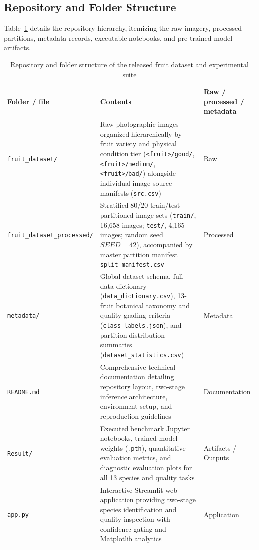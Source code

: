\documentclass[11pt,a4paper]{article}
\begin{document}
\subsection{Repository and Folder Structure}
Table~\ref{tab:folder-structure} details the repository hierarchy, itemizing the raw imagery, processed partitions, metadata records, executable notebooks, and pre-trained model artifacts.

\begin{table}[H]
\centering\small
\begin{tabularx}{\textwidth}{|p{}|X|p{}|}
\hline
\textbf{Folder / file} & \textbf{Contents} & \textbf{Raw / processed / metadata} \\
\hline
\texttt{fruit\_dataset/} & Raw photographic images organized hierarchically by fruit variety and physical condition tier (\texttt{<fruit>/good/}, \texttt{<fruit>/medium/}, \texttt{<fruit>/bad/}) alongside individual image source manifests (\texttt{src.csv}) & Raw \\
\hline
\texttt{fruit\_dataset\_processed/} & Stratified 80/20 train/test partitioned image sets (\texttt{train/}, 16,658 images; \texttt{test/}, 4,165 images; random seed $SEED = 42$), accompanied by master partition manifest \texttt{split\_manifest.csv} & Processed \\
\hline
\texttt{metadata/} & Global dataset schema, full data dictionary (\texttt{data\_dictionary.csv}), 13-fruit botanical taxonomy and quality grading criteria (\texttt{class\_labels.json}), and partition distribution summaries (\texttt{dataset\_statistics.csv}) & Metadata \\
\hline
\texttt{README.md} & Comprehensive technical documentation detailing repository layout, two-stage inference architecture, environment setup, and reproduction guidelines & Documentation \\
\hline
\texttt{Result/} & Executed benchmark Jupyter notebooks, trained model weights (\texttt{.pth}), quantitative evaluation metrics, and diagnostic evaluation plots for all 13 species and quality tasks & Artifacts / Outputs \\
\hline
\texttt{app.py} & Interactive Streamlit web application providing two-stage species identification and quality inspection with confidence gating and Matplotlib analytics & Application \\
\hline
\end{tabularx}
\caption{Repository and folder structure of the released fruit dataset and experimental suite}
\label{tab:folder-structure}
\end{table}
\end{document}
